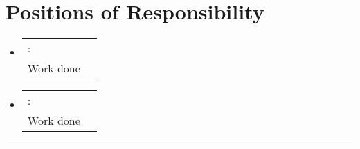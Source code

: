 \documentclass[a4paper,11pt]{article}
\makeatletter
\newcommand{\resumePOR}[3]{
\vspace{0.5mm}\item[]
    \begin{tabular*}{\textwidth}[t]{l@{\extracolsep{\fill}}r}
    \hspace{-3mm}{#1}:\hspace{1mm} & \hspace*{0pt}\hfill{\footnotesize{ #3}} \vspace{-0.5mm}\\ \hspace{-2.9mm}#2 
    \end{tabular*}
    \vspace{0mm}
}
\newcommand{\resumeSubHeadingListStart}{\begin{itemize}[leftmargin=*,labelsep=0mm,itemsep=-2.5mm]}
\newcommand{\resumeSubHeadingListEnd}{\end{itemize}\vspace{-2mm}}
\makeatother
\begin{document}
\vspace{-2.5mm}
\section{Positions of Responsibility}
\vspace{-0.4mm}

\resumeSubHeadingListStart
\resumePOR{\textbf{Member, ACM}} %
{Work done}{\raisebox{0.75pt}{2018 - 2020}}
\vspace{0.5mm}
\resumePOR{\textbf{President, SIAM}}
{Work done}
{\raisebox{0.75pt}{2018 - 2019}}
\vspace{-1mm}
\resumeSubHeadingListEnd
\hspace*{-2mm}\rule{1.030\textwidth}{0.1mm}
\vspace{0mm}

\end{document}
